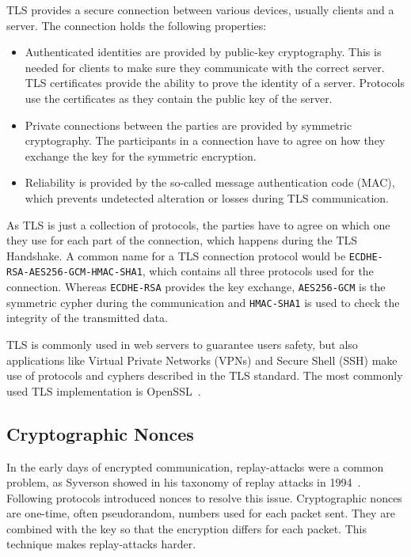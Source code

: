 TLS provides a secure connection between various devices, usually clients and a
server. The connection holds the following properties:
\begin{itemize}
  \item Authenticated identities are provided by public-key cryptography. This
is needed for clients to make sure they communicate with the correct server. TLS
certificates provide the ability to prove the identity of a server. Protocols
use the certificates as they contain the public key of the server.
  \item Private connections between the parties are provided by symmetric
cryptography. The participants in a connection have to agree on how they
exchange the key for the symmetric encryption.
  \item Reliability is provided by the so-called message authentication code
(MAC), which prevents undetected alteration or losses during TLS communication.
\end{itemize}

As TLS is just a collection of protocols, the parties have to agree on which one
they use for each part of the connection, which happens during the TLS
Handshake. A common name for a TLS connection protocol would be
\texttt{ECDHE-RSA-AES256-GCM-HMAC-SHA1}, which contains all three protocols used
for the connection. Whereas \texttt{ECDHE-RSA} provides the key exchange,
\texttt{AES256-GCM} is the  symmetric cypher during the communication and
\texttt{HMAC-SHA1} is used to check the integrity of the transmitted data.

TLS is commonly used in web servers to guarantee user\textquotesingle s safety,
but also applications like Virtual Private Networks (VPNs) and Secure Shell
(SSH) make use of protocols and cyphers described in the TLS standard. The most
commonly used TLS implementation is OpenSSL~\cite{opensslweb}.

\subsection{Cryptographic Nonces}

In the early days of encrypted communication, replay-attacks were a common
problem, as Syverson showed in his taxonomy of replay attacks in
1994~\cite{replaytax}. Following protocols introduced nonces to resolve this
issue. Cryptographic nonces are one-time, often pseudorandom, numbers used for
each packet sent. They are combined with the key so that the encryption differs
for each packet. This technique makes replay-attacks harder.

